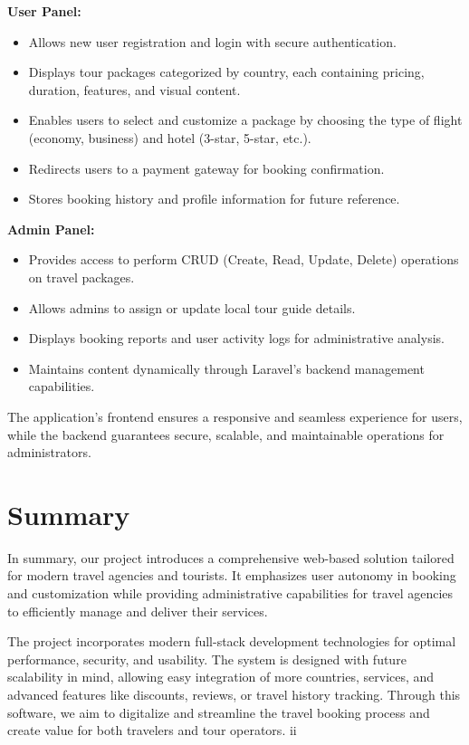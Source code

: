 \textbf{User Panel:}
\begin{itemize}
    \item Allows new user registration and login with secure authentication.
    \item Displays tour packages categorized by country, each containing pricing, duration, features, and visual content.
    \item Enables users to select and customize a package by choosing the type of flight (economy, business) and hotel (3-star, 5-star, etc.).
    \item Redirects users to a payment gateway for booking confirmation.
    \item Stores booking history and profile information for future reference.
\end{itemize}

\textbf{Admin Panel:}
\begin{itemize}
    \item Provides access to perform CRUD (Create, Read, Update, Delete) operations on travel packages.
    \item Allows admins to assign or update local tour guide details.
    \item Displays booking reports and user activity logs for administrative analysis.
    \item Maintains content dynamically through Laravel’s backend management capabilities.
\end{itemize}

The application’s frontend ensures a responsive and seamless experience for users, while the backend guarantees secure, scalable, and maintainable operations for administrators.

\section{Summary}
In summary, our project introduces a comprehensive web-based solution tailored for modern travel agencies and tourists. It emphasizes user autonomy in booking and customization while providing administrative capabilities for travel agencies to efficiently manage and deliver their services.

The project incorporates modern full-stack development technologies for optimal performance, security, and usability. The system is designed with future scalability in mind, allowing easy integration of more countries, services, and advanced features like discounts, reviews, or travel history tracking. Through this software, we aim to digitalize and streamline the travel booking process and create value for both travelers and tour operators.
ii